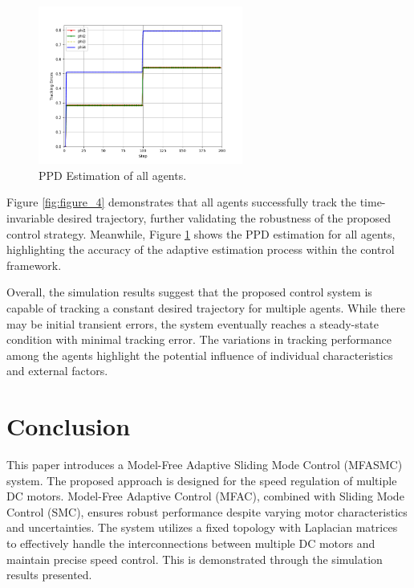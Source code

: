 \documentclass[journal,onecolumn]{IEEEtran}
\begin{document}
\begin{figure}[h!]
    \centering
    \includegraphics[width=0.6\textwidth]{Figure_5.png}
    \caption{PPD Estimation of all agents.}
    \label{fig:figure_5} %
\end{figure}

Figure \ref{fig:figure_4} demonstrates that all agents successfully track the time-invariable desired trajectory, further validating the robustness of the proposed control strategy. Meanwhile, Figure \ref{fig:figure_5} shows the PPD estimation for all agents, highlighting the accuracy of the adaptive estimation process within the control framework.

Overall, the simulation results suggest that the proposed control system is capable of tracking a constant desired trajectory for multiple agents. While there may be initial transient errors, the system eventually reaches a steady-state condition with minimal tracking error. The variations in tracking performance among the agents highlight the potential influence of individual characteristics and external factors.

\section{Conclusion}

This paper introduces a Model-Free Adaptive Sliding Mode Control (MFASMC) system. The proposed approach is designed for the speed regulation of multiple DC motors. Model-Free Adaptive Control (MFAC), combined with Sliding Mode Control (SMC), ensures robust performance despite varying motor characteristics and uncertainties. The system utilizes a fixed topology with Laplacian matrices to effectively handle the interconnections between multiple DC motors and maintain precise speed control. This is demonstrated through the simulation results presented.
\end{document}
